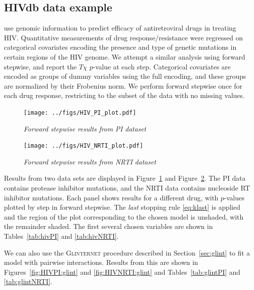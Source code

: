 \documentclass{imsart}
\begin{document}
\subsection{HIVdb data example}
\label{sec:hiv}

\cite{HIV} use genomic information to predict efficacy of antiretroviral
drugs in treating HIV. Quantitative measurements of drug
response/resistance were regressed on categorical covariates encoding
the presence and type of genetic mutations in certain regions of the HIV
genome. We attempt a similar
analysis using forward stepwise, and report the $T\chi$ $p$-value at each step.
Categorical covariates are encoded as groups of dummy variables using
the full encoding, and these groups are normalized by their Frobenius
norm. We perform forward stepwise once
for each drug response, restricting to the subset of the data with
no missing values.

\begin{figure}[!htp]
\begin{center}
\texttt{[image: ../figs/HIV\_PI\_plot.pdf]}
\caption{\small \it Forward stepwise results from PI dataset}
\label{fig:HIVPI}
\end{center}
\end{figure}

\begin{figure}[!htp]
\begin{center}
\texttt{[image: ../figs/HIV\_NRTI\_plot.pdf]}
\caption{\small \it Forward stepwise results from NRTI dataset}
\label{fig:HIVNRTI}
\end{center}
\end{figure}

Results from two data sets are displayed in Figure~\ref{fig:HIVPI} and
Figure~\ref{fig:HIVNRTI}. The PI data contains protease inhibitor
mutations, and the NRTI data contains nucleoside RT inhibitor mutations.
Each panel shows results for a different drug,
with $p$-values plotted by step in forward stepwise. 
The \textit{last} stopping rule \eqref{eq:klast} is applied and the region of the plot
corresponding to the chosen model is unshaded, with the remainder shaded.
The first several chosen variables are shown in Tables~\ref{tab:hivPI} and
\ref{tab:hivNRTI}.





We can also use the \textsc{Glinternet} procedure described in Section~\ref{sec:glint} to fit a model with pairwise interactions. Results from this are shown in Figures~\ref{fig:HIVPI:glint} and \ref{fig:HIVNRTI:glint} and Tables~\ref{tab:glintPI} and \ref{tab:glintNRTI}.
\end{document}
